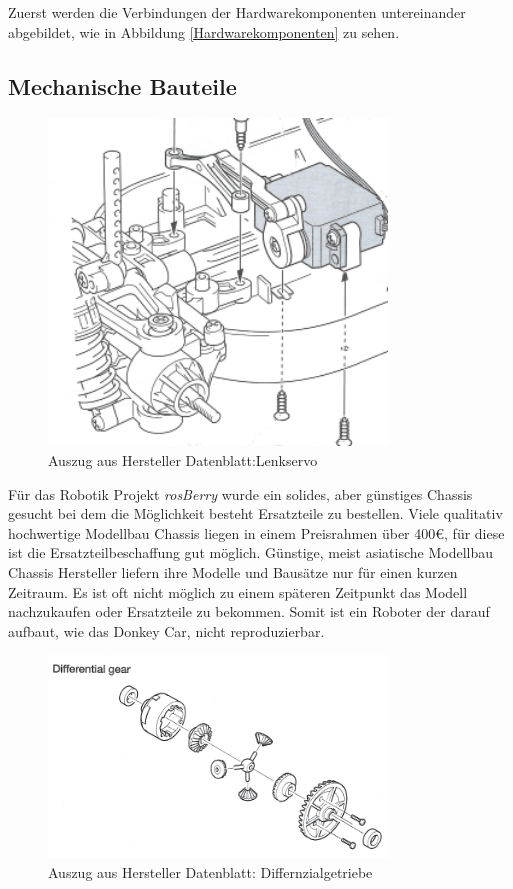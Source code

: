 \documentclass[conference]{IEEEtran}
\begin{document}
Zuerst werden die Verbindungen der Hardwarekomponenten untereinander abgebildet, wie in Abbildung \ref{Hardwarekomponenten} zu sehen.
\subsection{Mechanische Bauteile}

\begin{figure} %
	\centering
	\includegraphics[width=9cm]{img/servo.png}
	\caption{Auszug aus Hersteller Datenblatt:Lenkservo }
	\label{Servomotor}
\end{figure}
Für das Robotik Projekt \textit{rosBerry} wurde ein solides, aber günstiges Chassis gesucht bei dem die Möglichkeit besteht Ersatzteile zu bestellen. Viele qualitativ hochwertige Modellbau Chassis liegen in einem Preisrahmen über 400€, für diese ist die Ersatzteilbeschaffung gut möglich. Günstige, meist asiatische Modellbau Chassis Hersteller liefern ihre Modelle und Bausätze nur für einen kurzen Zeitraum. Es ist oft nicht möglich zu einem späteren Zeitpunkt das Modell nachzukaufen oder Ersatzteile zu bekommen. Somit ist ein Roboter der darauf aufbaut, wie das Donkey Car, nicht reproduzierbar. 
\\
\begin{figure} %
	\centering
	\includegraphics[width=9cm]{img/geer.png}
	\caption{Auszug aus Hersteller Datenblatt: Differnzialgetriebe }
	\label{Getriebe}
\end{figure}
\end{document}
